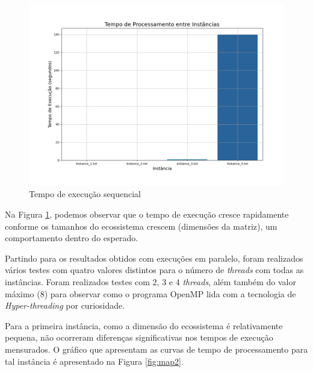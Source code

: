\documentclass[a4paper, 12pt]{article}
\begin{document}
\vspace*{-0.5cm}
\begin{figure}[H]
    \centering
    \includegraphics[width=1.1\textwidth]{Images/sequential.pdf}
    \vspace*{-1.5cm}
    \caption{Tempo de execução sequencial}
    \label{fig:map1}
\end{figure}

Na Figura \ref{fig:map1}, podemos observar que o tempo de execução cresce rapidamente conforme os tamanhos do ecossistema crescem (dimensões da matriz), um comportamento dentro do esperado.

Partindo para os resultados obtidos com execuções em paralelo, foram realizados vários testes com quatro valores distintos para o número de \emph{threads} com todas as instâncias. Foram realizados testes com 2, 3 e 4 \emph{threads}, além também do valor máximo (8) para observar como o programa OpenMP lida com a tecnologia de \emph{Hyper-threading} por curiosidade.

Para a primeira instância, como a dimensão do ecossistema é relativamente pequena, não ocorreram diferenças significativas nos tempos de execução mensurados. O gráfico que apresentam as curvas de tempo de processamento para tal instância é apresentado na Figura \ref{fig:map2}.
\end{document}
